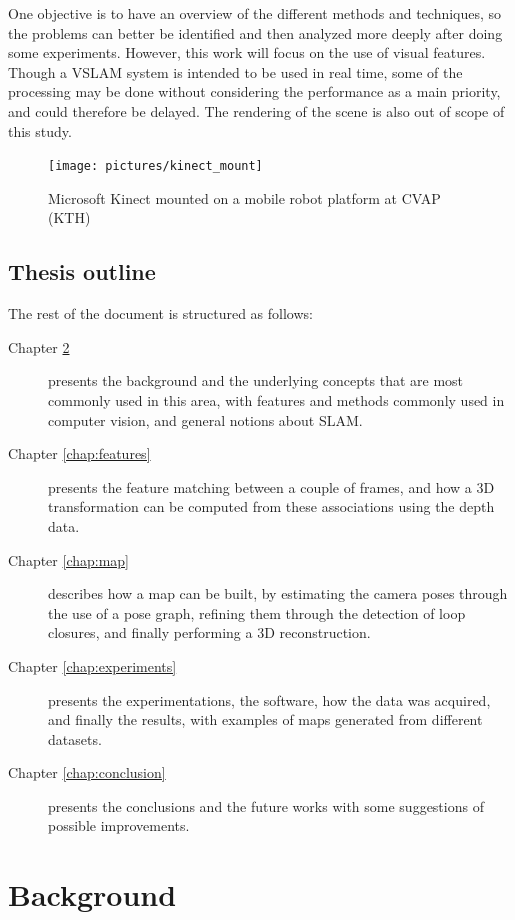 One objective is to have an overview of the different methods and techniques, so the problems can better be identified and then analyzed more deeply after doing some experiments. However, this work will focus on the use of visual features. Though a \gls{VSLAM} system is intended to be used in real time, some of the processing may be done without considering the performance as a main priority, and could therefore be delayed. The rendering of the scene is also out of scope of this study.

\begin{figure}[H]
\centering
\texttt{[image: pictures/kinect\_mount]}
\caption{Microsoft Kinect mounted on a mobile robot platform at CVAP (KTH)}
\end{figure}

\clearpage
\section{Thesis outline}

The rest of the document is structured as follows:
\begin{description}
\item[Chapter \ref{chap:background}] presents the background and the underlying concepts that are most commonly used in this area, with features and methods commonly used in computer vision, and general notions about SLAM.
\item[Chapter \ref{chap:features}] presents the feature matching between a couple of frames, and how a 3D transformation can be computed from these associations using the depth data.
\item[Chapter \ref{chap:map}] describes how a map can be built, by estimating the camera poses through the use of a pose graph, refining them through the detection of loop closures, and finally performing a 3D reconstruction.
\item[Chapter \ref{chap:experiments}] presents the experimentations, the software, how the data was acquired, and finally the results, with examples of maps generated from different datasets.
\item[Chapter \ref{chap:conclusion}] presents the conclusions and the future works with some suggestions of possible improvements.
\end{description}

\chapter{Background}
\label{chap:background}

